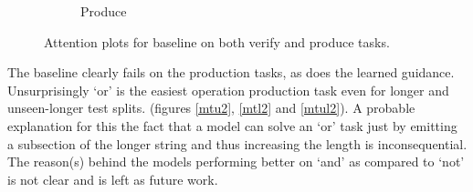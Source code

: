 \begin{figure}[ht]
\begin{subfigure}[b]{0.5\linewidth}
		\caption{Produce} 
		\label{base-prod} 
		\vspace{2ex}
	\end{subfigure}
	\caption{Attention plots for baseline on both verify and produce tasks. }
	\label{base-attn}
\end{figure}
The baseline clearly fails on the production tasks, as does the learned guidance. Unsurprisingly \lq or\rq{} is the easiest operation production task even for longer and unseen-longer test splits. (figures \ref{mtu2}, \ref{mtl2} and \ref{mtul2}). A probable explanation for this the fact that a model can solve an \lq or\rq{} task just by emitting a subsection of the longer string and thus increasing the length is inconsequential. The reason(s) behind the models performing better on \lq and\rq{} as compared to \lq not\rq{} is not clear and is left as future work.

